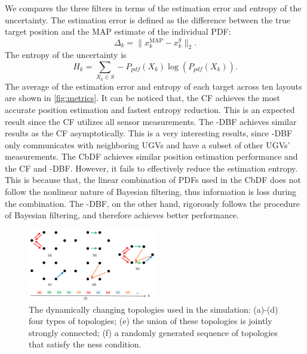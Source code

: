 	We compares the three filters in terms of the estimation error and entropy of the uncertainty.
	The estimation error is defined as the difference between the true target position and the MAP estimate of the individual PDF:
	\small\begin{equation*}
		\Delta_k = \|x^\text{MAP}_k-x^g_k\|_2.
	\end{equation*}\normalsize
	The entropy of the uncertainty is
	\small\begin{equation*}
		H_k = \sum\limits_{X_k\in S} -P_{pdf}(X_k)\log(P_{pdf}(X_k)).
	\end{equation*}\normalsize
	The average of the estimation error and entropy of each target across ten layouts are shown in \cref{fig:metrics}.
	It can be noticed that, the CF achieves the most accurate position estimation and fastest entropy reduction. 
	This is an expected result since the CF utilizes all sensor measurements.
	The \proto-DBF achieves similar results as the CF asymptotically. 
	This is a very interesting results, since \proto-DBF only communicates with neighboring UGVs and have a subset of other UGVs' measurements.
	The CbDF achieves similar position estimation performance and the CF and \proto-DBF. 
	However, it fails to effectively reduce the estimation entropy.
	This is because that, the linear combination of PDFs used in the CbDF does not follow the nonlinear nature of Bayesian filtering, thus information is loss during the combination.
	The \proto-DBF, on the other hand, rigorously follows the procedure of Bayesian filtering, and therefore achieves better performance.
		
		
	\begin{figure}		
			\includegraphics[width=0.5\textwidth]{figures/switch_topo}
			\caption{The dynamically changing topologies used in the simulation: (a)-(d) four types of topologies; (e) the union of these topologies is jointly strongly connected; (f) a randomly generated sequence of topologies that satisfy the \fc ness condition.}\label{fig:com_topo}		
	\end{figure}
	
